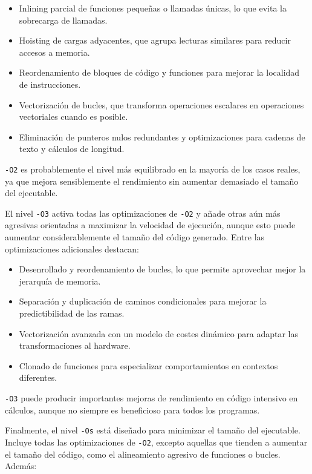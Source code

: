 \documentclass[11pt,a4paper,twoside]{article}
\theoremstyle{definition}
\begin{document}
	\begin{itemize}
		\item Inlining parcial de funciones pequeñas o llamadas únicas, lo que evita la sobrecarga de llamadas.
		\item Hoisting de cargas adyacentes, que agrupa lecturas similares para reducir accesos a memoria.
		\item Reordenamiento de bloques de código y funciones para mejorar la localidad de instrucciones.
		\item Vectorización de bucles, que transforma operaciones escalares en operaciones vectoriales cuando es posible.
		\item Eliminación de punteros nulos redundantes y optimizaciones para cadenas de texto y cálculos de longitud.
	\end{itemize}

	\texttt{-O2} es probablemente el nivel más equilibrado en la mayoría de los casos reales, ya que mejora sensiblemente el rendimiento sin aumentar demasiado el tamaño del ejecutable.
	
	El nivel \texttt{-O3} activa todas las optimizaciones de \texttt{-O2} y añade otras aún más agresivas orientadas a maximizar la velocidad de ejecución, aunque esto puede aumentar considerablemente el tamaño del código generado. Entre las optimizaciones adicionales destacan:
	
	\begin{itemize}
		\item Desenrollado y reordenamiento de bucles, lo que permite aprovechar mejor la jerarquía de memoria.
		\item Separación y duplicación de caminos condicionales para mejorar la predictibilidad de las ramas.
		\item Vectorización avanzada con un modelo de costes dinámico para adaptar las transformaciones al hardware.
		\item Clonado de funciones para especializar comportamientos en contextos diferentes.
	\end{itemize}

	\texttt{-O3} puede producir importantes mejoras de rendimiento en código intensivo en cálculos, aunque no siempre es beneficioso para todos los programas.
	
	Finalmente, el nivel \texttt{-Os} está diseñado para minimizar el tamaño del ejecutable. Incluye todas las optimizaciones de \texttt{-O2}, excepto aquellas que tienden a aumentar el tamaño del código, como el alineamiento agresivo de funciones o bucles. Además:
	
\end{document}
